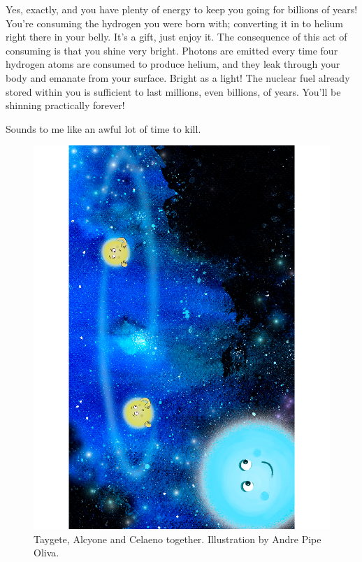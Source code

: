 \documentclass[main.tex]{subfiles}
\begin{document}
\par \Maia Yes, exactly, and you have plenty of energy to keep you going for billions of years!  You're consuming the hydrogen you were born with; converting it in to helium right there in your belly.  It's a gift, just enjoy it.  The consequence of this act of consuming is that you shine very bright.  Photons are emitted every time four hydrogen atoms are consumed to produce helium, and they leak through your body and emanate from your surface.  Bright as a light!  The nuclear fuel already stored within you is sufficient to last millions, even billions, of years.  You'll be shinning practically forever!

\par \Celaeno Sounds to me like an awful lot of time to kill.

\begin{figure}
\includegraphics[width=\columnwidth,angle=270,origin=c]{ch1_2.pdf}
\caption{Taygete, Alcyone and Celaeno together.  Illustration by Andre Pipe Oliva.
\label{fig:fig2}}
\end{figure}
\end{document}
